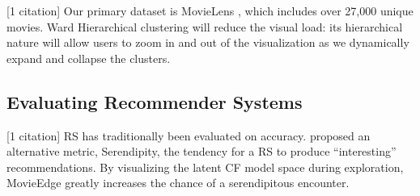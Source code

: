 [1 citation] Our primary dataset is MovieLens \cite{harper2016movielens}, which includes over 27,000 unique movies. Ward Hierarchical clustering \cite{ward1963hierarchical} will reduce the visual load:  its hierarchical nature will allow users to zoom in and out of the visualization as we dynamically expand and collapse the clusters.

\subsection{Evaluating Recommender Systems}

[1 citation] RS has traditionally been evaluated on accuracy. \cite{herlocker2004evaluating} proposed an alternative metric, Serendipity, the tendency for a RS to produce  “interesting” recommendations. By visualizing the latent CF model space during exploration, MovieEdge greatly increases the chance of a serendipitous encounter.


